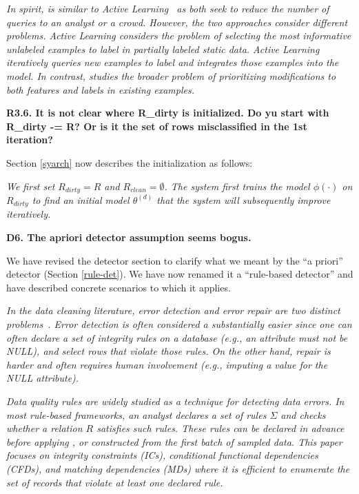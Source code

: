 \emph{In spirit, \sys is similar to Active Learning~\cite{DBLP:journals/pvldb/YakoutENOI11,gokhale2014corleone} as both seek to reduce the number of queries to an analyst or a crowd.
However, the two approaches consider different problems.
Active Learning considers the problem of selecting the most informative unlabeled examples to label in partially labeled static data.
Active Learning iteratively queries new examples to label and integrates those examples into the model.
In contrast, \sys studies the broader problem of prioritizing modifications to both features and labels in existing examples.} 

\vspace{0.5em}

\noindent\textbf{R3.6. It is not clear where R\_dirty is initialized. Do yu start with R\_dirty -= R? Or is it the set of rows misclassified in the 1st iteration?}

\noindent Section \ref{syarch} now describes the initialization as follows:

\emph{We first set $R_{dirty} = R$ and $R_{clean} = \emptyset$.
The system first trains the model $\phi(\cdot)$ on $R_{dirty}$ to find an initial model $\theta^{(d)}$ that the system will subsequently improve iteratively.}

\vspace{0.5em}

\noindent\textbf{D6. The apriori detector assumption seems bogus.} 

\noindent  We have revised the detector section to clarify what we meant by the ``a priori'' detector (Section \ref{rule-det}). We have now renamed it a ``rule-based detector'' and have described concrete scenarios to which it applies.

\vspace{0.5em}

\emph{In the data cleaning literature, error detection and error repair are two distinct problems~\cite{DBLP:series/synthesis/2012Fan, Dasu:2003:EDM:861869, rahm2000data}.
Error detection is often considered a substantially easier since one can often declare a set of integrity rules on a database (e.g., an attribute must not be NULL), and select rows that violate those rules.
On the other hand, repair is harder and often requires human involvement (e.g., imputing a value for the NULL attribute).}

\vspace{0.5em}

\emph{Data quality rules are widely studied as a technique for detecting data errors.
In most rule-based frameworks, an analyst declares a set of rules $\Sigma$ and checks whether a relation $R$ satisfies such rules.
These rules can be declared in advance before applying \sys, or constructed from the first batch of sampled data.
This paper focuses on integrity constraints (ICs), conditional functional dependencies (CFDs), and matching dependencies (MDs) where it is efficient to enumerate the set of records that violate at least one declared rule. }
